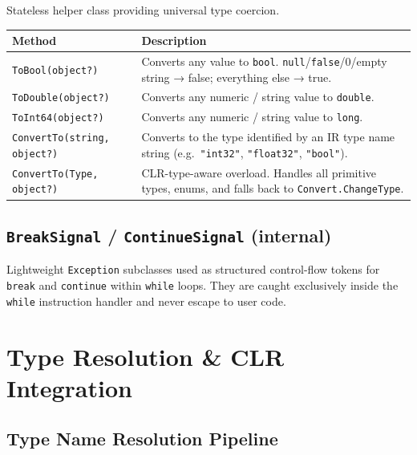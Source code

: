 \documentclass[11pt,a4paper]{article}
\newcommand{\code}[1]{\texttt{\small #1}}
\newcommand{\typename}[1]{\textcolor{typecolor}{\texttt{\small #1}}}
\begin{document}
Stateless helper class providing universal type coercion.

\begin{longtable}{lp{9cm}}
  \toprule
  \textbf{Method} & \textbf{Description} \\
  \midrule
  \endhead
  \code{ToBool(object?)}             & Converts any value to \code{bool}.
                                       \code{null}/\code{false}/0/empty string → false;
                                       everything else → true. \\
  \code{ToDouble(object?)}           & Converts any numeric / string value to
                                       \code{double}. \\
  \code{ToInt64(object?)}            & Converts any numeric / string value to
                                       \code{long}. \\
  \code{ConvertTo(string, object?)}  & Converts to the type identified by an IR
                                       type name string (e.g.\ \texttt{"int32"},
                                       \texttt{"float32"}, \texttt{"bool"}). \\
  \code{ConvertTo(Type, object?)}    & CLR-type-aware overload. Handles all primitive
                                       types, enums, and falls back to
                                       \code{Convert.ChangeType}. \\
  \bottomrule
\end{longtable}

\subsection{\texttt{BreakSignal} / \texttt{ContinueSignal} (internal)}

Lightweight \typename{Exception} subclasses used as structured control-flow tokens
for \code{break} and \code{continue} within \code{while} loops. They are caught
exclusively inside the \code{while} instruction handler and never escape to user code.

\section{Type Resolution \& CLR Integration}

\subsection{Type Name Resolution Pipeline}
\end{document}
